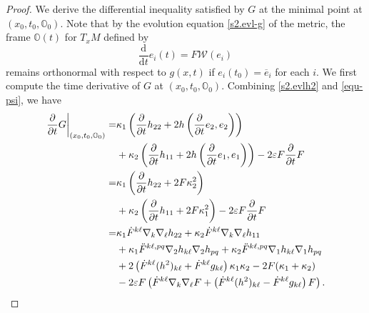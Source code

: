 \documentclass[11pt,reqno]{amsart}
\theoremstyle{remark}
\numberwithin{equation}{section}
\begin{document}
\begin{proof}
    We derive the differential inequality satisfied by $G$ at the minimal point at $(x_0,t_0,\mathbb{O}_0)$. Note that by the evolution equation \eqref{s2.evl-g} of the metric, the frame $\mathbb{O}(t)$ for $T_x M$ defined by
    \begin{equation*}
    	\dfrac{\mathrm{d}}{\mathrm{d}t}e_i(t) = F \mathcal{W}(e_i)
    \end{equation*}
    remains orthonormal with respect to $g(x,t)$ if $e_i(t_0)=\overline{e}_i$ for each $i$.  We first compute the 
    time derivative of $G$ at $(x_0,t_0,\mathbb{O}_0)$. Combining \eqref{s2.evlh2} and \eqref{equ-psi}, we have 
    \begin{align}
    	\left.\dfrac{\partial}{\partial t} G \right|_{(x_0,t_0,\mathbb{O}_0)} = & \kappa_1 \left(\frac{\partial}{\partial t}h_{22}+2h\left(\frac{\partial}{\partial t}e_2,e_2\right)\right) \nonumber\\
        &+ \kappa_2 \left(\frac{\partial}{\partial t}h_{11}+2h\left(\frac{\partial}{\partial t}e_1,e_1\right)\right) - 2 \varepsilon F \dfrac{\partial}{\partial t}F \notag\\
    	= & \kappa_1 \left(\frac{\partial}{\partial t}h_{22}+2F\kappa_2^2\right) \nonumber\\
        &+ \kappa_2 \left(\frac{\partial}{\partial t}h_{11}+2F\kappa_1^2\right) - 2 \varepsilon F \dfrac{\partial}{\partial t}F \notag\\
        = &  \kappa_1 \dot{F}^{k\ell} \nabla_k\nabla_{\ell} h_{22} + \kappa_2 \dot{F}^{k\ell}\nabla_k\nabla_{\ell} h_{11} \nonumber\\
        &+ \kappa_1\ddot{F}^{k\ell,pq}\nabla_2 h_{k\ell}\nabla_2 h_{pq} + \kappa_2 \ddot{F}^{k\ell,pq}\nabla_1 h_{k\ell}\nabla_1 h_{pq} \nonumber\\
    	& + 2 \left( \dot{F}^{k\ell}(h^2)_{k\ell} + \dot{F}^{k\ell}g_{k\ell} \right)\kappa_1\kappa_2 - 2 F (\kappa_1+\kappa_2) \nonumber\\
    	& - 2\varepsilon F \left( \dot{F}^{k\ell} \nabla_k \nabla_{\ell} F + \left( \dot{F}^{k\ell}(h^2)_{k\ell} - \dot{F}^{k\ell}g_{k\ell} \right)F  \right).
    	\label{equ-Gt-2}
    \end{align}
    

\end{proof}
\end{document}
